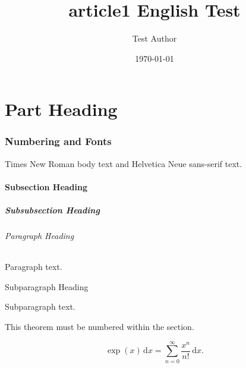 \documentclass[11pt,a4paper]{article}
\title{article1 English Test}
\author{Test Author}
\date{\today}
\begin{document}
\maketitle
\tableofcontents

\part{Part Heading}

\section{Numbering and Fonts}

Times New Roman body text and \textsf{Helvetica Neue sans-serif text}.

\subsection{Subsection Heading}

\subsubsection{Subsubsection Heading}

\paragraph{Paragraph Heading}
Paragraph text.

\subparagraph{Subparagraph Heading}
Subparagraph text.

\begin{theorem}[Heading]
This theorem must be numbered within the section.
\end{theorem}

\[
  \exp(x)\,\mathrm{d}x
  = \sum_{n=0}^{\infty}\frac{x^n}{n!}\,\mathrm{d}x.
\]
\end{document}
